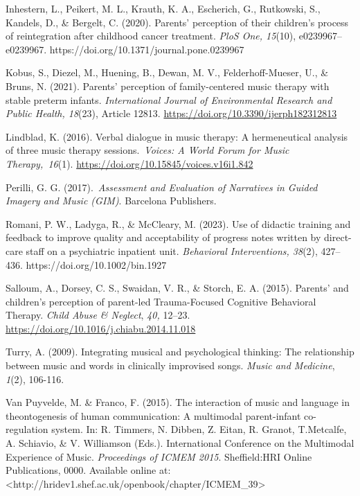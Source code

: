 \documentclass[authordate, empirical, issue]{jote-new-article}
\begin{document}
Inhestern, L., Peikert, M. L., Krauth, K. A., Escherich, G., Rutkowski, S., Kandels, D., \& Bergelt, C. (2020). Parents' perception of their children's process of reintegration after childhood cancer treatment. \emph{PloS One, 15}(10), e0239967--e0239967. https://doi.org/10.1371/journal.pone.0239967



Kobus, S., Diezel, M., Huening, B., Dewan, M. V., Felderhoff-Mueser, U., \& Bruns, N. (2021). Parents' perception of family-centered music therapy with stable preterm infants. \emph{International Journal of Environmental Research and Public Health, 18}(23), Article 12813. \href{https://doi.org/10.3390/ijerph182312813}{https://doi.org/10.3390/ijerph182312813}



Lindblad, K. (2016). Verbal dialogue in music therapy: A hermeneutical analysis of three music therapy sessions. \emph{Voices: A World Forum for Music Therapy,}\emph{ }\emph{16}(1). \href{https://doi.org/10.15845/voices.v16i1.842}{https://doi.org/10.15845/voices.v16i1.842}



Perilli, G. G. (2017). \emph{Assessment and Evaluation of Narratives in Guided Imagery and Music (GIM)}. Barcelona Publishers.



Romani, P. W., Ladyga, R., \& McCleary, M. (2023). Use of didactic training and feedback to improve quality and acceptability of progress notes written by direct-care staff on a psychiatric inpatient unit. \emph{Behavioral Interventions, 38}(2), 427-- 436. https://doi.org/10.1002/bin.1927



Salloum, A., Dorsey, C. S., Swaidan, V. R., \& Storch, E. A. (2015). Parents' and children's perception of parent-led Trauma-Focused Cognitive Behavioral Therapy. \emph{Child Abuse \& Neglect}, \emph{40,} 12--23. \href{https://doi.org/10.1016/j.chiabu.2014.11.018}{https://doi.org/10.1016/j.chiabu.2014.11.018}



Turry, A. (2009). Integrating musical and psychological thinking: The relationship between music and words in clinically improvised songs. \emph{Music and Medicine}, \emph{1}(2), 106-116.



Van Puyvelde, M. \& Franco, F. (2015). The interaction of music and language in theontogenesis of human communication: A multimodal parent-infant co-regulation system. In: R. Timmers, N. Dibben, Z. Eitan, R. Granot, T.Metcalfe, A. Schiavio, \& V. Williamson (Eds.). International Conference on the Multimodal Experience of Music. \emph{Proceedings of ICMEM 2015}. Sheffield:HRI Online Publications, 0000. Available online at:<http://hridev1.shef.ac.uk/openbook/chapter/ICMEM\_39>
\end{document}
